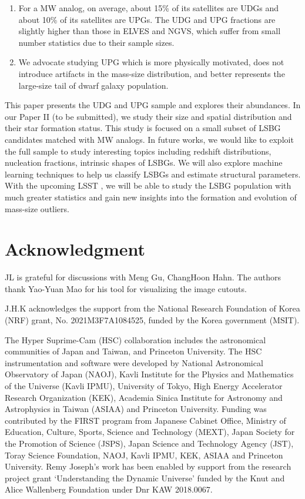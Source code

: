 \documentclass[twocolumn,astrosymb,twocolappendix]{aastex631}
\begin{document}
\begin{CJK*}{UTF8}{gbsn}
\begin{enumerate}
    \item For a MW analog, on average, about 15\% of its satellites are UDGs and about 10\% of its satellites are UPGs. The UDG and UPG fractions are slightly higher than those in ELVES and NGVS, which suffer from small number statistics due to their sample sizes. 
    
    \item We advocate studying UPG which is more physically motivated, does not introduce artifacts in the mass-size distribution, and better represents the large-size tail of dwarf galaxy population. 
\end{enumerate}

This paper presents the UDG and UPG sample and explores their abundances. In our Paper II (to be submitted), we study their size and spatial distribution and their star formation status. This study is focused on a small subset of LSBG candidates matched with MW analogs. In future works, we would like to exploit the full sample to study interesting topics including redshift distributions, nucleation fractions, intrinsic shapes of LSBGs. We will also explore machine learning techniques to help us classify LSBGs and estimate structural parameters. With the upcoming LSST \citep{lsst2009,LSST2019}, we will be able to study the LSBG population with much greater statistics and gain new insights into the formation and evolution of mass-size outliers. 

\section*{Acknowledgment}
JL is grateful for discussions with Meng Gu, ChangHoon Hahn. The authors thank Yao-Yuan Mao for his tool for visualizing the image cutouts. 

J.H.K acknowledges the support from the National Research Foundation of Korea (NRF) grant, No. 2021M3F7A1084525, funded by the Korea government (MSIT).

The Hyper Suprime-Cam (HSC) collaboration includes the astronomical communities of Japan and Taiwan, and Princeton University. The HSC instrumentation and software were developed by National Astronomical Observatory of Japan (NAOJ), Kavli Institute for the Physics and Mathematics of the Universe (Kavli IPMU), University of Tokyo, High Energy Accelerator Research Organization (KEK), Academia Sinica Institute for Astronomy and Astrophysics in Taiwan (ASIAA) and Princeton University.  
Funding was contributed by the FIRST program from Japanese Cabinet Office, Ministry of Education, Culture, Sports, Science and Technology (MEXT), Japan Society for the Promotion of Science (JSPS), Japan Science and Technology Agency (JST), Toray Science Foundation, NAOJ, Kavli IPMU, KEK, ASIAA and Princeton University. Remy Joseph's work has been enabled by support from the research project grant ‘Understanding the Dynamic Universe’ funded by the Knut and Alice Wallenberg Foundation under Dnr KAW 2018.0067.


\end{CJK*}
\end{document}

